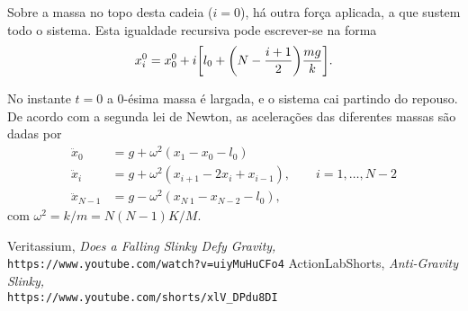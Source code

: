 \documentclass{article}
\begin{document}
\vspace{0.75em}
\noindent
Sobre a massa no topo desta cadeia ($i=0$), há outra força aplicada, a que
sustem todo o sistema. Esta igualdade recursiva pode escrever-se na forma
\begin{equation}
  x^0_i = x^0_0 + i\qty[l_0 + \qty(N-\frac{i+1}{2})\frac{mg}{k}].
\end{equation}

No instante $t=0$ a 0-ésima massa é largada, e o sistema cai partindo do
repouso. De acordo com a segunda lei de Newton, as acelerações das diferentes
massas são dadas por
\begin{equation}
  \begin{aligned}
    \ddot x_0     &= g + \omega^2 (x_1-x_0-l_0)\\
    \ddot x_i     &= g + \omega^2 
      (x_{i+1}-2x_i+x_{i-1}),\qquad i=1, \ldots, N-2\\
    \ddot x_{N-1} &= g - \omega^2 (x_{N~1}-x_{N-2}-l_0),
  \end{aligned}
\end{equation}
com $\omega^2=k/m=N(N-1)K/M$.



\begin{thebibliography}{100}
   Veritassium, 
    \textsl{Does a Falling Slinky Defy Gravity,}\\
    \texttt{https://www.youtube.com/watch?v=uiyMuHuCFo4}
      ActionLabShorts,
      \textsl{Anti-Gravity Slinky,}\\
      \texttt{https://www.youtube.com/shorts/xlV\_DPdu8DI}
\end{thebibliography}
\end{document}
